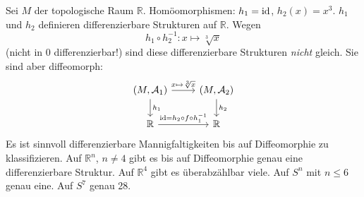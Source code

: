 Sei $M$ der topologische Raum $\mathds{R}$. Homöomorphismen: $h_1 = \operatorname{id}$, $h_2(x) = x^3$. $h_1$ und $h_2$ definieren differenzierbare Strukturen auf $\mathds{R}$. Wegen
\[
	h_1 \circ  h_2 ^{-1} : x  \mapsto \sqrt[3]{x}
\]
(nicht in $0$ differenzierbar!) sind diese differenzierbare Strukturen \emph{nicht} gleich. Sie sind aber diffeomorph:
\[
	\begin{tikzcd}
		(M, \mathcal{A}_1 ) \rar{x \mapsto \sqrt[3]{x}  } \dar{h_1} & (M, \mathcal{A}_2 ) \dar{h_2}\\
		\mathds{R} \rar{\id = h_2 \circ f \circ h_1^{-1}} & \mathds{R}
	\end{tikzcd}
\]
Es ist sinnvoll differenzierbare Mannigfaltigkeiten bis auf Diffeomorphie zu klassifizieren. Auf $\mathds{R}^n$, $n\not= 4$ 
gibt es bis auf Diffeomorphie genau eine 
differenzierbare Struktur.  Auf $\mathds{R}^4$ gibt es überabzählbar viele. Auf $S^n$ mit $n \le 6$ genau eine. Auf $S^7$ genau 28.

